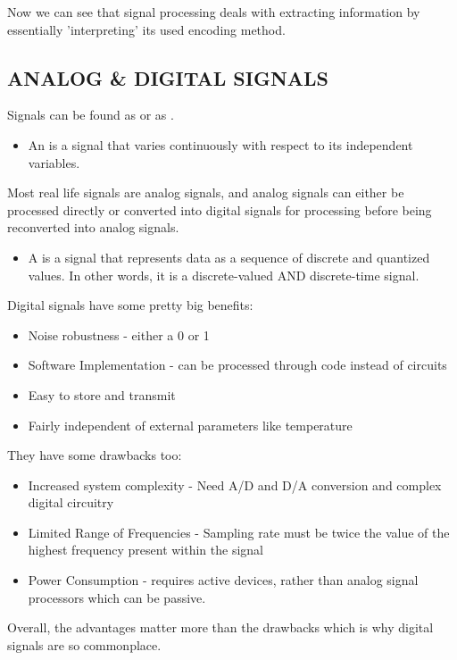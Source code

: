\documentclass[]{report}
\newenvironment{definition}{
	\begin{remark}\begin{itemize}[labelindent=5em,labelsep=0.25cm,leftmargin=*]
		\item[{{\itshape\scshape\color{purple!55!red}{Definition}}}]{}
	}
	{
	\end{itemize}\end{remark}
}
\newcommand{\keyword}[1]{{{\color{green}{#1}}}}
\begin{document}
Now we can see that signal processing deals with extracting information by essentially 'interpreting' its used encoding method.

\subsection*{ANALOG \& DIGITAL SIGNALS}

Signals can be found as \keyword{analog signals} or as \keyword{digital signals}.
\begin{definition}
	An \keyword{analog signal} is a signal that varies continuously with respect to its independent variables.
\end{definition}

Most real life signals are analog signals, and analog signals can either be processed directly or converted into digital signals for processing before being reconverted into analog signals.

\begin{definition}
	A \keyword{digital signal} is a signal that represents data as a sequence of discrete and quantized values. In other words, it is a discrete-valued AND discrete-time signal.
\end{definition}

Digital signals have some pretty big benefits:
\begin{itemize}
	\item Noise robustness - either a 0 or 1
	\item Software Implementation - can be processed through code instead of circuits
	\item Easy to store and transmit
	\item Fairly independent of external parameters like temperature
\end{itemize}

They have some drawbacks too:
\begin{itemize}
	\item Increased system complexity - Need A/D and D/A conversion and complex digital circuitry
	\item Limited Range of Frequencies - Sampling rate must be twice the value of the highest frequency present within the signal
	\item Power Consumption - requires active devices, rather than analog signal processors which can be passive.
\end{itemize}

Overall, the advantages matter more than the drawbacks which is why digital signals are so commonplace.
\end{document}
